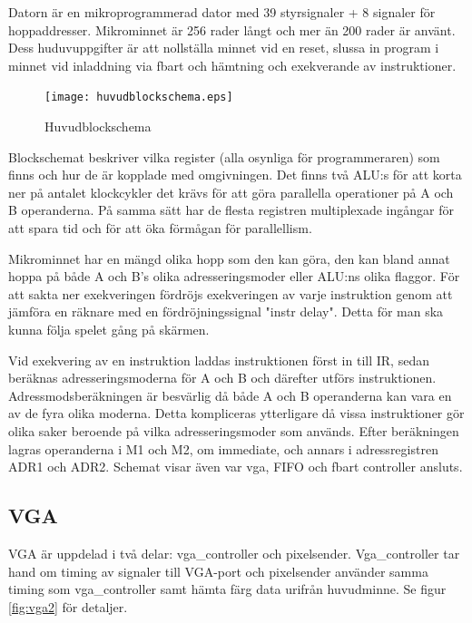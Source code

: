 \documentclass[11pt]{article}
\begin{document}
Datorn är en mikroprogrammerad dator med 39 styrsignaler + 8 signaler för hoppaddresser. Mikrominnet är 256 rader långt och mer än 200 rader är använt. Dess huduvuppgifter är att nollställa minnet vid en reset, slussa in program i minnet vid inladdning via fbart och hämtning och exekverande av instruktioner.

\begin{figure}[h]
    \begin{center}
        \texttt{[image: huvudblockschema.eps]}
        \caption{Huvudblockschema}
        \label{fig:huvud}
    \end{center}
\end{figure}

\newpage

Blockschemat beskriver vilka register (alla osynliga för programmeraren) som finns och hur de är kopplade med omgivningen. Det finns två ALU:s för att korta ner på antalet klockcykler det krävs för att göra parallella operationer på A och B operanderna. På samma sätt har de flesta registren multiplexade ingångar för att spara tid och för att öka förmågan för parallellism.

Mikrominnet har en mängd olika hopp som den kan göra, den kan bland annat hoppa på både A och B's olika adresseringsmoder eller ALU:ns olika flaggor. För att sakta ner exekveringen fördröjs exekveringen av varje instruktion genom att jämföra en räknare med en fördröjningssignal "instr delay". Detta för man ska kunna följa spelet gång på skärmen.

Vid exekvering av en instruktion laddas instruktionen först in till IR, sedan beräknas adresseringsmoderna för A och B och därefter utförs instruktionen. Adressmodsberäkningen är besvärlig då både A och B operanderna kan vara en av de fyra olika moderna. Detta kompliceras ytterligare då vissa instruktioner gör olika saker beroende på vilka adresseringsmoder som används. Efter beräkningen lagras operanderna i M1 och M2, om immediate, och annars i adressregistren ADR1 och ADR2. Schemat visar även var vga, FIFO och fbart controller ansluts.

\newpage
\subsection{VGA}

VGA är uppdelad i två delar: vga\_controller och pixelsender. Vga\_controller tar hand om timing av signaler till VGA-port och pixelsender använder samma timing som vga\_controller samt hämta färg data urifrån huvudminne. Se figur \ref{fig:vga2} för detaljer.
\end{document}
